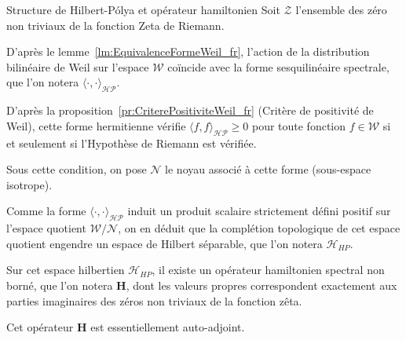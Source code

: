 \documentclass[Riemann_Hypothesis.tex]{subfiles}
\begin{document}
\begin{lemma}[label=lm:ConstructionMetriqueHP_fr]{Structure de Hilbert-Pólya et opérateur hamiltonien}
    Soit $\mathcal{Z}$ l'ensemble des zéro non triviaux de la fonction Zeta de Riemann.\par
    D'après le lemme~\ref{lm:EquivalenceFormeWeil_fr},
    l'action de la distribution bilinéaire de Weil sur l'espace $\mathcal{W}$
    coïncide avec la forme sesquilinéaire spectrale, que l'on
    notera $\langle \cdot, \cdot \rangle_{\mathcal{HP}}$. \par
    D'après la {proposition}~\ref{pr:CriterePositiviteWeil_fr} (Critère de positivité
    de Weil), cette forme hermitienne vérifie $\langle f, f \rangle_{\mathcal{HP}}
    \geq 0$ pour toute fonction $f \in \mathcal{W}$ si et seulement si l'Hypothèse
    de Riemann est vérifiée. \par
    Sous cette condition, on pose $\mathcal{N}$ le noyau associé à cette forme
    (sous-espace isotrope). \par
    Comme la forme $\langle \cdot, \cdot \rangle_{\mathcal{HP}}$ induit un produit
    scalaire strictement défini positif sur l'espace quotient
    $\mathcal{W} / \mathcal{N}$, on en déduit que la complétion topologique de cet
    espace quotient engendre un espace de Hilbert séparable, que l'on notera
    $\mathcal{H}_{HP}$. \par
    Sur cet espace hilbertien $\mathcal{H}_{HP}$, il existe un opérateur
    hamiltonien spectral non borné, que l'on notera $\mathbf{H}$, dont les
    valeurs propres correspondent exactement aux parties imaginaires des zéros
    non triviaux de la fonction zêta. \par
    Cet opérateur $\mathbf{H}$ est essentiellement auto-adjoint.
\end{lemma}
\end{document}
